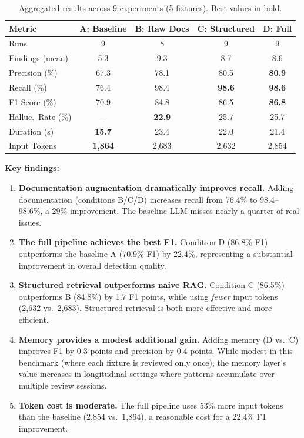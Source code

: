 \documentclass[sigconf,nonacm]{acmart}
\begin{document}
\begin{table}[h]
\centering
\caption{Aggregated results across 9 experiments (5 fixtures). Best values in bold.}
\label{tab:results}
\begin{tabular}{lcccc}
\hline
\textbf{Metric} & \textbf{A: Baseline} & \textbf{B: Raw Docs} & \textbf{C: Structured} & \textbf{D: Full} \\
\hline
Runs & 9 & 8 & 9 & 9 \\
Findings (mean) & 5.3 & 9.3 & 8.7 & 8.6 \\
Precision (\%) & 67.3 & 78.1 & 80.5 & \textbf{80.9} \\
Recall (\%) & 76.4 & 98.4 & \textbf{98.6} & \textbf{98.6} \\
F1 Score (\%) & 70.9 & 84.8 & 86.5 & \textbf{86.8} \\
Halluc.\ Rate (\%) & --- & \textbf{22.9} & 25.7 & 25.7 \\
Duration (s) & \textbf{15.7} & 23.4 & 22.0 & 21.4 \\
Input Tokens & \textbf{1,864} & 2,683 & 2,632 & 2,854 \\
\hline
\end{tabular}
\end{table}

\textbf{Key findings:}

\begin{enumerate}
    \item \textbf{Documentation augmentation dramatically improves recall.} Adding documentation (conditions B/C/D) increases recall from 76.4\% to 98.4--98.6\%, a 29\% improvement. The baseline LLM misses nearly a quarter of real issues.

    \item \textbf{The full pipeline achieves the best F1.} Condition D (86.8\% F1) outperforms the baseline A (70.9\% F1) by 22.4\%, representing a substantial improvement in overall detection quality.

    \item \textbf{Structured retrieval outperforms naive RAG.} Condition C (86.5\%) outperforms B (84.8\%) by 1.7 F1 points, while using \emph{fewer} input tokens (2,632 vs.\ 2,683). Structured retrieval is both more effective and more efficient.

    \item \textbf{Memory provides a modest additional gain.} Adding memory (D vs.\ C) improves F1 by 0.3 points and precision by 0.4 points. While modest in this benchmark (where each fixture is reviewed only once), the memory layer's value increases in longitudinal settings where patterns accumulate over multiple review sessions.

    \item \textbf{Token cost is moderate.} The full pipeline uses 53\% more input tokens than the baseline (2,854 vs.\ 1,864), a reasonable cost for a 22.4\% F1 improvement.
\end{enumerate}
\end{document}
